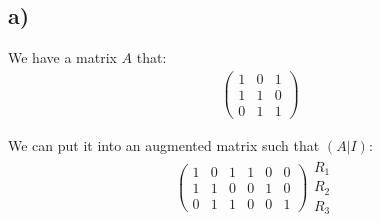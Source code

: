 \documentclass[12pt]{article}
\begin{document}
\subsection{a)}
We have a matrix $A$ that:
\begin{align*}
\left(\begin{array}{ccc}
1 & 0 & 1 \\
1 & 1 & 0 \\
0 & 1 & 1
\end{array}\right)
\end{align*}

We can put it into an augmented matrix such that $(A|I)$:
\begin{align*}
\left(\begin{array}{ccc|ccc}
1 & 0 & 1 & 1 & 0 & 0 \\
1 & 1 & 0 & 0 & 1 & 0 \\
0 & 1 & 1 & 0 & 0 & 1
\end{array}\right)
\begin{array}{l}
  \text{$R_1$}\\
  \text{$R_2$}\\
  \text{$R_3$ }
\end{array}
\end{align*}
\end{document}
